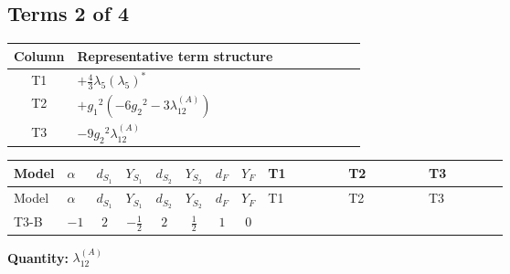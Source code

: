 \documentclass[8pt]{article}
\begin{document}
\begin{landscape}
\subsection*{Terms 2 of 4}
\begin{center}
\begin{tabular}{@{}c >{\raggedright\arraybackslash}p{0.82\linewidth}@{}}
\toprule
Column & Representative term structure \\
\midrule
T1 & \(\displaystyle +\frac{4}{3} {\lambda_5} \left({\lambda_5}\right)^{*}\) \\
\midrule
T2 & \(\displaystyle +{g_1}^2 \left(-6 {g_2}^2-3 {\lambda_{12}^{(A)}}\right)\) \\
\midrule
T3 & \(\displaystyle -9 {g_2}^2 {\lambda_{12}^{(A)}}\) \\
\midrule
\bottomrule
\end{tabular}
\end{center}
\smallskip
\tiny
\begin{longtable}{@{}llcccccc >{\raggedright\arraybackslash}p{0.21\linewidth} >{\raggedright\arraybackslash}p{0.21\linewidth} >{\raggedright\arraybackslash}p{0.21\linewidth}@{}}
\toprule
Model & $\alpha$ & $d_{S_1}$ & $Y_{S_1}$ & $d_{S_2}$ & $Y_{S_2}$ & $d_F$ & $Y_F$ & T1 & T2 & T3 \\
\midrule
\endfirsthead
\toprule
Model & $\alpha$ & $d_{S_1}$ & $Y_{S_1}$ & $d_{S_2}$ & $Y_{S_2}$ & $d_F$ & $Y_F$ & T1 & T2 & T3 \\
\midrule
\endhead
T3-B & $-1$ & $2$ & $-\frac{1}{2}$ & $2$ & $\frac{1}{2}$ & $1$ & $0$ & \scriptsize\adjustbox{max width=\linewidth}{$\begin{gathered} +\frac{4}{3} {\lambda_5} \left({\lambda_5}\right)^{*}\end{gathered}$} & \scriptsize\adjustbox{max width=\linewidth}{$\begin{gathered} +{g_1}^2 \left(-6 {g_2}^2-3 {\lambda_{12}^{(A)}}\right)\end{gathered}$} & \scriptsize\adjustbox{max width=\linewidth}{$\begin{gathered} -9 {g_2}^2 {\lambda_{12}^{(A)}}\end{gathered}$} \\
\midrule
\bottomrule
\end{longtable}
\clearpage
\noindent\textbf{Quantity: }$\lambda_{12}^{(A)}$\par\smallskip

\end{landscape}
\end{document}
